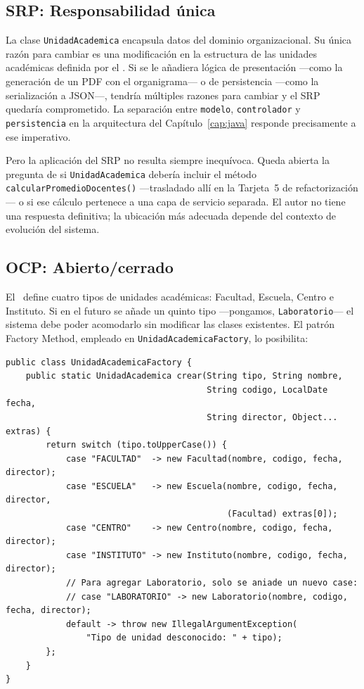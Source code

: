 \subsection{SRP: Responsabilidad única}
\label{subsec:solid-srp}

La clase \texttt{UnidadAcademica} encapsula datos del dominio organizacional. Su única razón
para cambiar es una modificación en la estructura de las unidades académicas definida por el
\acuerdo. Si se le añadiera lógica de presentación ---como la generación de un PDF con el
organigrama--- o de persistencia ---como la serialización a JSON---, tendría múltiples razones
para cambiar y el SRP quedaría comprometido. La separación entre \texttt{modelo},
\texttt{controlador} y \texttt{persistencia} en la arquitectura del Capítulo~\ref{cap:java}
responde precisamente a ese imperativo.

Pero la aplicación del SRP no resulta siempre inequívoca. Queda abierta la pregunta de si
\texttt{UnidadAcademica} debería incluir el método \texttt{calcularPromedioDocentes()}
---trasladado allí en la Tarjeta~5 de refactorización--- o si ese cálculo pertenece a una
capa de servicio separada. El autor no tiene una respuesta definitiva; la ubicación más
adecuada depende del contexto de evolución del sistema.

\subsection{OCP: Abierto/cerrado}
\label{subsec:solid-ocp}

El \acuerdo\ define cuatro tipos de unidades académicas: Facultad, Escuela, Centro e Instituto.
Si en el futuro se añade un quinto tipo ---pongamos, \texttt{Laboratorio}--- el sistema debe
poder acomodarlo sin modificar las clases existentes. El patrón Factory Method, empleado en
\texttt{UnidadAcademicaFactory}, lo posibilita:

\begin{lstlisting}[style=javaStyle,
  caption={Factory Method extensible para unidades académicas.},
  label={lst:ocp-factory}]
public class UnidadAcademicaFactory {
    public static UnidadAcademica crear(String tipo, String nombre,
                                        String codigo, LocalDate fecha,
                                        String director, Object... extras) {
        return switch (tipo.toUpperCase()) {
            case "FACULTAD"  -> new Facultad(nombre, codigo, fecha, director);
            case "ESCUELA"   -> new Escuela(nombre, codigo, fecha, director,
                                            (Facultad) extras[0]);
            case "CENTRO"    -> new Centro(nombre, codigo, fecha, director);
            case "INSTITUTO" -> new Instituto(nombre, codigo, fecha, director);
            // Para agregar Laboratorio, solo se aniade un nuevo case:
            // case "LABORATORIO" -> new Laboratorio(nombre, codigo, fecha, director);
            default -> throw new IllegalArgumentException(
                "Tipo de unidad desconocido: " + tipo);
        };
    }
}
\end{lstlisting}

